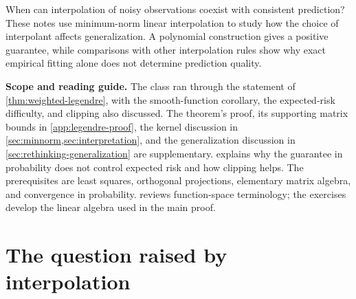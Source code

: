 \documentclass[11pt,twoside]{article}
\theoremstyle{definition}
\theoremstyle{remark}
\begin{document}
\begin{center}
\end{center}

When can interpolation of noisy observations coexist with consistent
prediction? These notes use minimum-norm linear interpolation to study how
the choice of interpolant affects generalization. A polynomial construction
gives a positive guarantee, while comparisons with other interpolation rules
show why exact empirical fitting alone does not determine prediction quality.

\noindent\textbf{Scope and reading guide.}
The class ran through the statement of \cref{thm:weighted-legendre}, with
the smooth-function corollary, the expected-risk difficulty, and clipping
also discussed. The theorem's proof, its supporting matrix bounds in
\cref{app:legendre-proof}, the kernel discussion in
\cref{sec:minnorm,sec:interpretation}, and the generalization
discussion in \cref{sec:rethinking-generalization} are supplementary.
 explains why the guarantee in probability does not
control expected risk and how clipping helps. The prerequisites are least
squares, orthogonal projections, elementary matrix algebra, and convergence
in probability.  reviews function-space terminology;
the exercises develop the linear algebra used in the main proof.

\section{The question raised by interpolation}
\label{sec:question}
\end{document}
